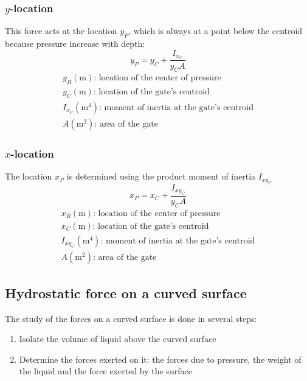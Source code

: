 \documentclass[10pt, twocolumn]{article}
\begin{document}
\subsubsection*{\(y\)-location}
This force acts at the location \(y_P\), which is always at a point below the centroid because pressure increase with depth:
\[
  y_P = y_C + \frac{I_{x_C}}{y_C A}
\]
\[
  \begin{array}{|l}
    y_R (\si{\metre}) \text{: location of the center of pressure}                    \\
    y_C (\si{\metre}) \text{: location of the gate's centroid}                       \\
    I_{x_C} (\si{\metre\tothe{4}}) \text{: moment of inertia at the gate's centroid} \\
    A (\si{\metre\squared}) \text{: area of the gate}
  \end{array}
\]

\subsubsection*{\(x\)-location}
The location \(x_P\) is determined using the product moment of inertia \(I_{{xy}_C}\)
\[
  x_P = x_C + \frac{I_{{xy}_C}}{y_C A}
\]
\[
  \begin{array}{|l}
    x_R (\si{\metre}) \text{: location of the center of pressure}                       \\
    x_C (\si{\metre}) \text{: location of the gate's centroid}                          \\
    I_{{xy}_C} (\si{\metre\tothe{4}}) \text{: moment of inertia at the gate's centroid} \\
    A (\si{\metre\squared}) \text{: area of the gate}
  \end{array}
\]


\subsection{Hydrostatic force on a curved surface}
The study of the forces on a curved surface is done in several steps:
\begin{enumerate}
  \item Isolate the volume of liquid above the curved surface
  \item Determine the forces exerted on it: the forces due to pressure, the weight of the liquid and the force exerted by the surface
\end{enumerate}
\end{document}
